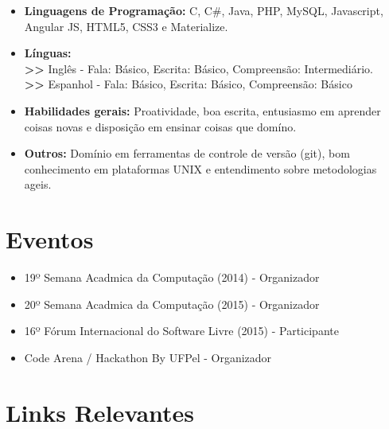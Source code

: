\documentclass[11pt,a4paper,sans]{moderncv}        %
\begin{document}
\vspace{6pt}

\begin{itemize}

\item \textbf{Linguagens de Programação:} C, C\#, Java, PHP, MySQL, Javascript, Angular JS, HTML5, CSS3 e Materialize.

\vspace{6pt}

\item \textbf{Línguas:}
\\\textbf{>>} Inglês - Fala: Básico, Escrita: Básico, Compreensão: Intermediário. 
\\\textbf{>>} Espanhol - Fala: Básico, Escrita: Básico, Compreensão: Básico 

\vspace{6pt}

\item \textbf{Habilidades gerais:} Proatividade, boa escrita, entusiasmo em aprender coisas novas e disposição em ensinar coisas que domíno.

\vspace{6pt}

\item \textbf{Outros:} Domínio em ferramentas de controle de versão (git), bom conhecimento em plataformas UNIX e entendimento sobre metodologias ageis.

\end{itemize}


\section{Eventos}

\vspace{6pt}
 
\begin{itemize}

\item{19º Semana Acadmica da Computação (2014) - Organizador}
\item{20º Semana Acadmica da Computação (2015)  - Organizador}
\item{16º Fórum Internacional do Software Livre (2015) - Participante}
\item{Code Arena / Hackathon By UFPel - Organizador}
\end{itemize}

\section{Links Relevantes}
\end{document}
